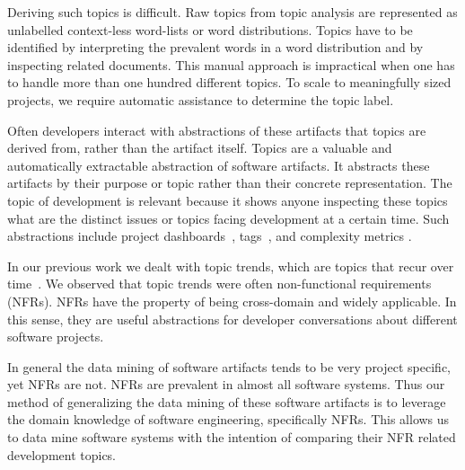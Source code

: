 \documentclass[]{sig-alternate}
\begin{document}

Deriving such topics is difficult. 
Raw topics from topic analysis are represented as unlabelled context-less word-lists or word distributions.
Topics have to be identified by interpreting the prevalent words in a word distribution and by inspecting related documents. 
This manual approach is impractical when one has to handle more than one hundred different topics. 
To scale to meaningfully sized projects, we require automatic assistance to determine the topic label.

Often developers interact with abstractions of these artifacts that topics are derived from, rather than the artifact itself. 
Topics are a valuable and automatically extractable abstraction of software artifacts.
It abstracts these artifacts by their purpose or topic rather than their concrete representation.
The topic of development is relevant because it shows anyone inspecting these topics what are the distinct issues or topics facing development at a certain time.
Such abstractions include project dashboards~\cite{kersten2005mylar}, tags~\cite{treude2010}, and complexity metrics \cite{mccabe1976complexity}. 


In our previous work we dealt with topic trends, which are topics that recur over time~\cite{Hindle09ICSM}. 
We observed that topic trends were often non-functional requirements (NFRs). 
NFRs have the property of being cross-domain and widely applicable. 
In this sense, they are useful abstractions for developer conversations about different software projects.

In general the data mining of software artifacts tends to be very project specific, yet NFRs are not. 
NFRs are prevalent in almost all software systems.
Thus our method of generalizing the data mining of these software artifacts is to leverage  the domain knowledge of software engineering, specifically NFRs. 
This allows us to data mine software systems with the intention of comparing their NFR related development topics.
\end{document}
